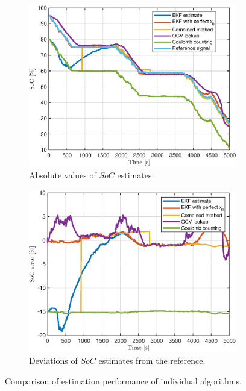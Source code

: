 \begin{figure}[hbp]
    \centering
\begin{subfigure}{0.49\textwidth}
    \centering
    \includegraphics[width=\textwidth]{figures/8/comparison.eps}
    \caption{Absolute values of $SoC$ estimates.}
    \label{fig:8-comparison-abs}
    \end{subfigure}
    \hfill
    \begin{subfigure}{0.49\textwidth}
    \centering
    \includegraphics[width=\textwidth]{figures/8/comparison-dev.eps}
    \caption{Deviations of $SoC$ estimates from the reference.}
    \label{fig:8-comparison-dev}
    \end{subfigure}
    
    \caption{Comparison of estimation performance of individual algorithms.}
    \label{fig:8-comparison}
\end{figure}


